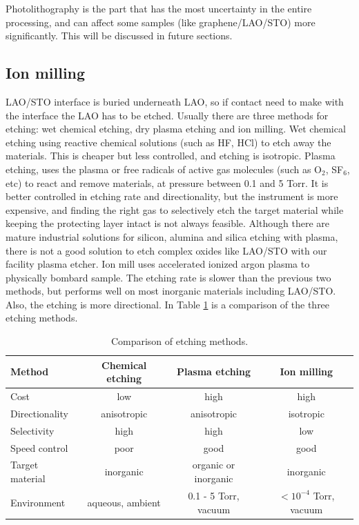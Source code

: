 \documentclass[pdflatex, sectionletters, 12pt]{pittetd}    %
\begin{document}
 Photolithography is the part that has the most uncertainty in the entire processing, and can affect some samples (like graphene/LAO/STO) more significantly. This will be discussed in future sections. 

\subsection{Ion milling}
\label{SEC:IonMilling}
LAO/STO interface is buried underneath LAO, so if contact need to make with the interface the LAO has to be etched. Usually there are three methods for etching: wet chemical etching, dry plasma etching and ion milling. Wet chemical etching using reactive chemical solutions (such as HF, HCl) to etch away the materials. This is  cheaper but less controlled, and etching is isotropic. Plasma etching, uses the plasma or free radicals of active gas molecules (such as O$_2$, SF$_6$, etc) to react and remove materials, at pressure between 0.1 and 5 Torr. It is better controlled in etching rate and directionality, but the instrument is more expensive, and finding the right gas to selectively etch the target material while keeping the protecting layer intact is not always feasible. Although there are mature industrial solutions for silicon, alumina and silica etching with plasma, there is not a good solution to etch complex oxides like LAO/STO with our facility plasma etcher. Ion mill uses accelerated ionized argon plasma to physically bombard sample. The etching rate is slower than the previous two methods, but performs well on most inorganic materials including LAO/STO. Also, the etching is more directional. In Table \ref{tab:etching} is a comparison of the three etching methods.

\begin{table}
	\centering
	\begin{tabular}{l|ccc}
		\hline
		Method	&	Chemical etching	&	Plasma etching	& Ion milling \\ \hline
		Cost	&	low	& high	& high \\ 
		Directionality	&	anisotropic	&	anisotropic	&	isotropic \\ 
		Selectivity	&	high	&	high	&	low \\
		Speed control	&	poor	&	good	&	good \\
		Target material	&	inorganic	&	organic or inorganic	&	inorganic \\
		Environment	&	aqueous, ambient	&	0.1 - 5 Torr, vacuum	&	$< 10^{-4}$ Torr, vacuum \\
		\hline  
		
	\end{tabular}
	\caption{Comparison of etching methods.}
	\label{tab:etching}
	
\end{table}
\end{document}
